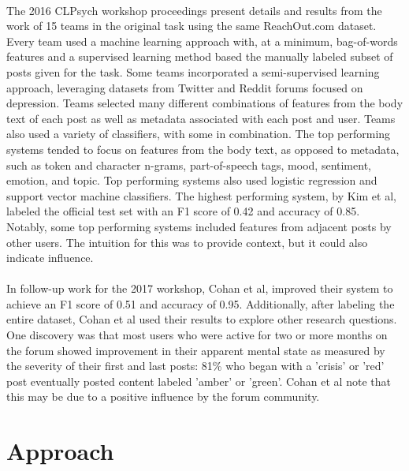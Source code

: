 \documentclass{article}
\begin{document}
\paragraph{}The 2016 CLPsych workshop proceedings present details and results from the work of 15 teams in the original task using the same ReachOut.com dataset. Every team used a machine learning approach with, at a minimum, bag-of-words features and a supervised learning method based the manually labeled subset of posts given for the task. Some teams incorporated a semi-supervised learning approach, leveraging datasets from Twitter and Reddit forums focused on depression. Teams selected many different combinations of features from the body text of each post as well as metadata associated with each post and user. Teams also used a variety of classifiers, with some in combination\cite{milne}. The top performing systems tended to focus on features from the body text, as opposed to metadata, such as token and character n-grams, part-of-speech tags, mood, sentiment, emotion, and topic. Top performing systems also used logistic regression and support vector machine classifiers. The highest performing system, by Kim et al, labeled the official test set with an F1 score of 0.42 and accuracy of 0.85\cite{kim}. Notably, some top performing systems included features from adjacent posts by other users. The intuition for this was to provide context, but it could also indicate influence.

\paragraph{}In follow-up work for the 2017 workshop, Cohan et al, improved their system to achieve an F1 score of 0.51 and accuracy of 0.95. Additionally, after labeling the entire dataset, Cohan et al used their results to explore other research questions. One discovery was that most users who were active for two or more months on the forum showed improvement in their apparent mental state as measured by the severity of their first and last posts: 81\% who began with a 'crisis' or 'red' post eventually posted content labeled 'amber' or 'green'\cite{cohan2}. Cohan et al note that this may be due to a positive influence by the forum community.

\section{Approach}
\end{document}
